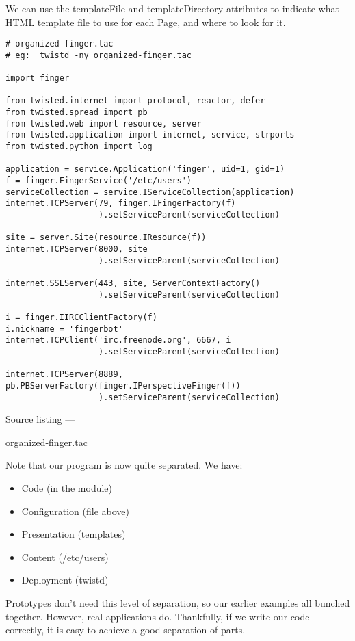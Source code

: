 We can use the templateFile and templateDirectory attributes to indicate what HTML template file to use for each Page, and where to look for it.\begin{verbatim}
# organized-finger.tac
# eg:  twistd -ny organized-finger.tac

import finger

from twisted.internet import protocol, reactor, defer
from twisted.spread import pb
from twisted.web import resource, server
from twisted.application import internet, service, strports
from twisted.python import log

application = service.Application('finger', uid=1, gid=1)
f = finger.FingerService('/etc/users')
serviceCollection = service.IServiceCollection(application)
internet.TCPServer(79, finger.IFingerFactory(f)
                   ).setServiceParent(serviceCollection)

site = server.Site(resource.IResource(f))
internet.TCPServer(8000, site
                   ).setServiceParent(serviceCollection)

internet.SSLServer(443, site, ServerContextFactory()
                   ).setServiceParent(serviceCollection)

i = finger.IIRCClientFactory(f)
i.nickname = 'fingerbot'
internet.TCPClient('irc.freenode.org', 6667, i
                   ).setServiceParent(serviceCollection)

internet.TCPServer(8889, pb.PBServerFactory(finger.IPerspectiveFinger(f))
                   ).setServiceParent(serviceCollection)
\end{verbatim}\parbox[b]{\linewidth}{\begin{center}Source listing --- \begin{em}organized-finger.tac\end{em}\end{center}}

 Note that our program is now quite separated. We have: \begin{itemize}
\item Code (in the module)
\item Configuration (file above)
\item Presentation (templates)
\item Content (/etc/users)
\item Deployment (twistd)
\end{itemize}
  Prototypes don't need this level of separation, so our earlier examples all bunched together. However, real applications do. Thankfully, if we write our code correctly, it is easy to achieve a good separation of parts. 

